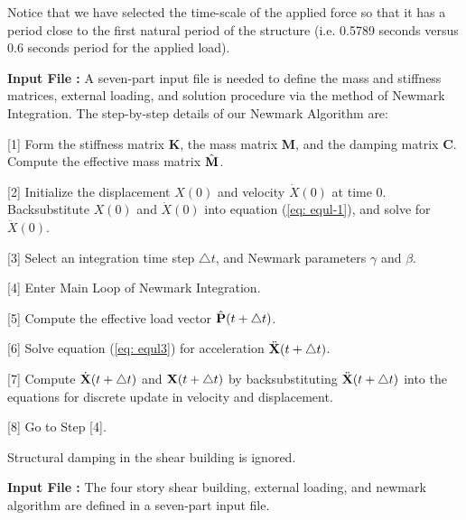 \vspace{0.15 in}\noindent
Notice that we have selected the time-scale of the applied
force so that it has a period close to the first
natural period of the structure (i.e. 0.5789 seconds
versus 0.6 seconds period for the applied load).

\vspace{0.15 in}\noindent
{\bf Input File :} A seven-part input file is needed to define the
mass and stiffness matrices, external loading, and solution
procedure via the method of Newmark Integration.
The step-by-step details of our Newmark Algorithm are:

\begin{description}
\item{[1]}
Form the stiffness matrix {\bf K},
the mass matrix {\bf M}, and the damping matrix {\bf C}.
Compute the effective mass matrix $\hat{\bf M}$.
\item{[2]}
Initialize the displacement ${X}(0)$ and velocity $\dot{X}(0)$ at time $0$.
Backsubstitute ${X}(0)$ and $\dot{X}(0)$ into equation (\ref{eq: equl-1}),
and solve for $\ddot{X}(0)$.
\item{[3]}
Select an integration time step $\triangle t$,
and Newmark parameters $\gamma$ and $\beta$.
\item{[4]}
Enter Main Loop of Newmark Integration.
\item{[5]}
Compute the effective load vector $\hat{\bf P}{(t+\triangle t)}$.
\item{[6]}
Solve equation (\ref{eq: equl3}) for acceleration $\ddot{\bf X}{(t + \triangle t)}$.
\item{[7]}
Compute $\dot{\bf X}{(t + \triangle t)}$ and ${\bf X}{(t + \triangle t)}$
by backsubstituting $\ddot{\bf X}{(t + \triangle t)}$ into the
equations for discrete update in velocity and displacement.
\item{[8]}
Go to Step [4].
\end{description}

\vspace{0.15 in}\noindent
Structural damping in the shear building is ignored.

\vspace{0.15 in}\noindent
{\bf Input File :} The four story shear building, external loading,
and newmark algorithm are defined in a seven-part input file.

